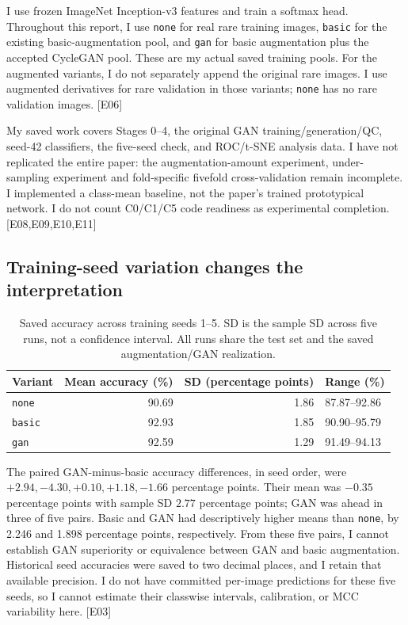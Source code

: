 \documentclass[11pt,a4paper]{article}
\newcommand{\ev}[1]{\textcolor{Link}{\textsf{[#1]}}}
\newcommand{\pp}{percentage points}
\newcommand{\BasicSeedMean}{92.93}
\newcommand{\BasicSeedSd}{1.85}
\newcommand{\GanSeedMean}{92.59}
\newcommand{\GanSeedSd}{1.29}
\newcommand{\NoneSeedMean}{90.69}
\newcommand{\NoneSeedSd}{1.86}
\newcommand{\SeedDiff}{-0.35}
\newcommand{\SeedDiffSd}{2.77}
\begin{document}
I use frozen ImageNet Inception-v3 features and train a softmax head. Throughout
this report, I use \texttt{none} for real rare training images, \texttt{basic}
for the existing basic-augmentation pool, and \texttt{gan} for basic
augmentation plus the accepted CycleGAN pool. These are my actual saved
training pools. For the augmented variants, I do not separately append the
original rare images. I use augmented derivatives for rare validation in
those variants; \texttt{none} has no rare validation images. \ev{E06}

My saved work covers Stages 0--4, the original GAN training/generation/QC,
seed-42 classifiers, the five-seed check, and ROC/t-SNE analysis data. I have
not replicated the entire paper: the augmentation-amount experiment,
under-sampling experiment and fold-specific fivefold cross-validation remain
incomplete. I implemented a class-mean baseline, not the paper's trained
prototypical network. I do not count C0/C1/C5 code readiness as experimental
completion. \ev{E08,E09,E10,E11}

\subsection{Training-seed variation changes the interpretation}

\begin{table}[htbp]
\centering
\caption{Saved accuracy across training seeds 1--5. SD is the sample SD
across five runs, not a confidence interval. All runs share the test set and
the saved augmentation/GAN realization.}
\label{tab:seeds}
\begin{tabular}{lrrl}
\toprule
Variant & Mean accuracy (\%) & SD (\pp) & Range (\%)\\
\midrule
\texttt{none} & \NoneSeedMean & \NoneSeedSd & 87.87--92.86\\
\texttt{basic} & \BasicSeedMean & \BasicSeedSd & 90.90--95.79\\
\texttt{gan} & \GanSeedMean & \GanSeedSd & 91.49--94.13\\
\bottomrule
\end{tabular}
\end{table}

The paired GAN-minus-basic accuracy differences, in seed order, were
$+2.94,-4.30,+0.10,+1.18,-1.66$ \pp. Their mean was
$\SeedDiff$ \pp{} with sample SD $\SeedDiffSd$ \pp;
GAN was ahead in three of five pairs. Basic and GAN had descriptively higher
means than \texttt{none}, by 2.246 and 1.898 \pp, respectively.
From these five pairs, I cannot establish GAN superiority or equivalence
between GAN and basic augmentation. Historical seed accuracies were saved to
two decimal places, and I retain that available precision. I do not have
committed per-image predictions for these five seeds, so I cannot estimate
their classwise intervals, calibration, or MCC variability here. \ev{E03}
\end{document}
